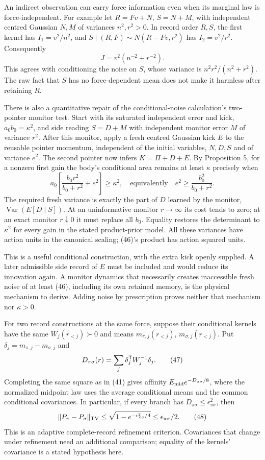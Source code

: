 \documentclass[11pt,a4paper]{article}
\begin{document}
An indirect observation can carry force information even when its
marginal law is force-independent. For example let \(R=Fv+N\),
\(S=N+M\), with independent centred Gaussian \(N,M\) of variances
\(n^2,r^2>0\). In record order \(R,S\), the first kernel has
\(I_1=v^2/n^2\), and \(S\mid(R,F)\sim N(R-Fv,r^2)\) has \(I_2=v^2/r^2\).
Consequently \[J=v^2(n^{-2}+r^{-2}).\tag{45}\] This agrees with
conditioning the noise on \(S\), whose variance is \(n^2r^2/(n^2+r^2)\).
The raw fact that \(S\) has no force-dependent mean does not make it
harmless after retaining \(R\).

There is also a quantitative repair of the conditional-noise
calculation's two-pointer monitor test. Start with its saturated
independent error and kick, \(a_0b_0=\kappa^2\), and side reading
\(S=D+M\) with independent monitor error \(M\) of variance \(r^2\).
After this monitor, apply a fresh centred Gaussian kick \(E\) to the
reusable pointer momentum, independent of the initial variables,
\(N,D,S\) and of variance \(e^2\). The second pointer now infers
\(K=\Pi+D+E\). By Proposition 5, for a nonzero first gain the body's
conditional area remains at least \(\kappa\) precisely when
\[a_0\left[\frac{b_0r^2}{b_0+r^2}+e^2\right]\ge\kappa^2,
\quad\text{equivalently}\quad
e^2\ge\frac{b_0^2}{b_0+r^2}.\tag{46}\] The required fresh variance is
exactly the part of \(D\) learned by the monitor,
\(\operatorname{Var}(E[D\mid S])\). At an uninformative monitor
\(r\to\infty\) its cost tends to zero; at an exact monitor
\(r\downarrow0\) it must replace all \(b_0\). Equality restores the
determinant to \(\kappa^2\) for every gain in the stated product-prior
model. All these variances have action units in the canonical scaling;
(46)'s product has action squared units.

This is a useful conditional construction, with the extra kick openly
supplied. A later admissible side record of \(E\) must be included and
would reduce its innovation again. A monitor dynamics that necessarily
creates inaccessible fresh noise of at least (46), including its own
retained memory, is the physical mechanism to derive. Adding noise by
prescription proves neither that mechanism nor \(\kappa>0\).

For two record constructions at the same force, suppose their
conditional kernels have the same \(W_j(r_{<j})\succ0\) and means
\(m_{\pi,j}(r_{<j})\), \(m_{\sigma,j}(r_{<j})\). Put
\(\delta_j=m_{\pi,j}-m_{\sigma,j}\) and
\[D_{\pi\sigma}(r)=\sum_j\delta_j^{\sf T}W_j^{-1}\delta_j.
\tag{47}\] Completing the same square as in (41) gives affinity
\(E_{\rm mid}e^{-D_{\pi\sigma}/8}\), where the normalized midpoint law
uses the average conditional means and the common conditional
covariances. In particular, if every branch has
\(D_{\pi\sigma}\le\epsilon_{\pi\sigma}^2\), then
\[\|P_\pi-P_\sigma\|_{\rm TV}
\le\sqrt{1-e^{-\epsilon_{\pi\sigma}^2/4}}
\le\epsilon_{\pi\sigma}/2.\tag{48}\] This is an adaptive complete-record
refinement criterion. Covariances that change under refinement need an
additional comparison; equality of the kernels' covariance is a stated
hypothesis here.
\end{document}
